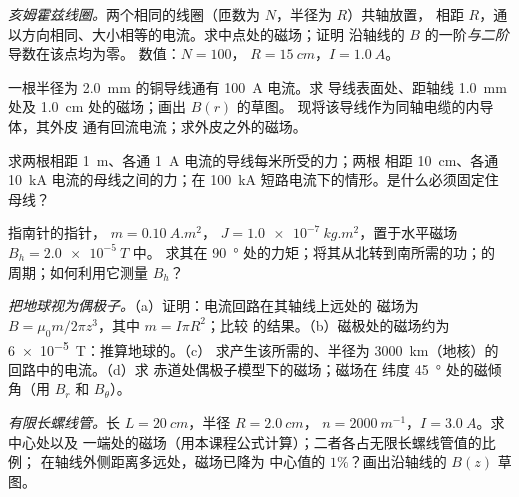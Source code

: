 \begin{exercise}[$\star\star$]\label{exo:b1:magnetostatics:6}
\emph{亥姆霍兹线圈。}两个相同的线圈（匝数为 $N$，半径为 $R$）共轴放置，
相距 $R$，通以方向相同、大小相等的电流。求中点处的磁场；证明
沿轴线的 $B$ 的一阶\emph{与二阶}导数在该点均为零。
数值：$N = 100$，
$R = \qty{15}{cm}$，$I = \qty{1.0}{A}$。
\end{exercise}

\begin{exercise}[$\star\star$]\label{exo:b1:magnetostatics:7}
一根半径为 \qty{2.0}{mm} 的铜导线通有 \qty{100}{A} 电流。求
导线表面处、距轴线 \qty{1.0}{mm} 处及 \qty{1.0}{cm} 处的磁场；画出 $B(r)$ 的草图。
现将该导线作为同轴电缆的内导体，其外皮
通有回流电流；求外皮之外的磁场。
\end{exercise}

\begin{exercise}[$\star\star$]\label{exo:b1:magnetostatics:8}
求两根相距 \qty{1}{m}、各通 \qty{1}{A} 电流的导线每米所受的力；两根
相距 \qty{10}{cm}、各通 \qty{10}{kA} 电流的母线之间的力；在
\qty{100}{kA} 短路电流下的情形。是什么必须固定住母线？
\end{exercise}

\begin{exercise}[$\star\star$]\label{exo:b1:magnetostatics:9}
指南针的指针， $m = \qty{0.10}{A.m^2}$，
$J = \qty{1.0e-7}{kg.m^2}$，置于水平磁场 $B_h = \qty{2.0e-5}{T}$ 中。
求其在 \qty{90}{\degree} 处的力矩；将其从北转到南所需的功；的
周期；如何利用它测量 $B_h$？
\end{exercise}

\begin{exercise}[$\star\star\star$]\label{exo:b1:magnetostatics:10}
\emph{把地球视为偶极子。}（a）证明：电流回路在其轴线上远处的
磁场为 $B = \mu_0m/2\pi z^3$，其中 $m = I\pi R^2$；比较
的结果。（b）磁极处的磁场约为
\qty{6e-5}{T}：推算地球的。（c）
求产生该所需的、半径为 \qty{3000}{km}（地核）的回路中的电流。（d）求
赤道处偶极子模型下的磁场；磁场在
纬度 \qty{45}{\degree} 处的磁倾角（用 $B_r$ 和 $B_\theta$）。
\end{exercise}

\begin{exercise}[$\star\star\star$]\label{exo:b1:magnetostatics:11}
\emph{有限长螺线管。}长 $L = \qty{20}{cm}$，半径 $R = \qty{2.0}{cm}$，
$n = \qty{2000}{m^{-1}}$，$I = \qty{3.0}{A}$。求中心处以及
一端处的磁场（用本课程公式计算）；二者各占无限长螺线管值的比例；
在轴线外侧距离多远处，磁场已降为
中心值的 $1\%$？画出沿轴线的 $B(z)$ 草图。
\end{exercise}

